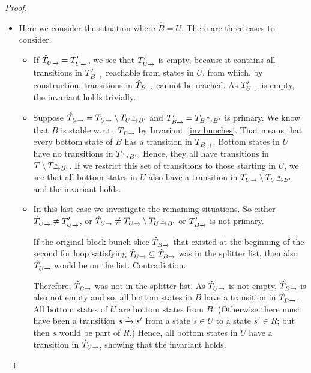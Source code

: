 \documentclass[a4paper,10pt]{article}
\theoremstyle{definition}
\theoremstyle{plain}
\newcommand{\pijl}[1]{\mathrel{\text{$\xrightarrow{\smash[t]{#1}}$}}}
\newcommand{\TB}{T_{B\pijl{}}}
\newcommand{\TBaB}{T_{B\pijl{a} B'}}
\newcommand{\TaB}{T_{\pijl{a} B'}}
\begin{document}
\begin{proof}
\begin{itemize}
\begin{itemize}
		Therefore, $\hat{T}_{B\pijl{}}$ was not in the splitter list.
		As $\hat{T}_{B\pijl{}}$ was not empty, all bottom states in $B$ would have transitions in $\hat{T}_{B\pijl{}}$.
		As all new bottom states are moved to $N$, all bottom states in $R'$ are also bottom states in $B$,
		and it follows that all bottom states in $R'$ have transitions in $\hat{T}_{R'\pijl{}}$.
		Hence, the invariant holds.
	\end{itemize}
\item
	Here we consider the situation where $\hat{B}=U$.
	There are three cases to consider.%
	\begin{itemize}
	\item	If $\hat{T}_{U\pijl{}}=T'_{U\pijl{}}$,
		we see that $T'_{U\pijl{}}$ is empty,
		because it contains all transitions in $T'_{B\pijl{}}$ reachable from states in $U$,
		from which, by construction, transitions in $\hat{T}_{B\pijl{}}$ cannot be reached.
		As $T'_{U\pijl{}}$ is empty, the invariant holds trivially.
	\item	Suppose $\hat{T}_{U\pijl{}}=T_{U\pijl{}}\setminus T_{U\pijl{a}B'}$ and $\TB' = \TBaB$ is primary.
		We know that $B$ is stable w.r.t.\ $\TB$ by Invariant~\ref{inv:bunches}.
		That means that every bottom state of $B$ has a transition in $\TB$.
		Bottom states in $U$ have no transitions in $\TaB$.
		Hence, they all have transitions in $T\setminus \TaB$.
		If we restrict this set of transitions to those starting in $U$,
		we see that all bottom states in $U$ also have a transition in $T_{U\pijl{}}\setminus T_{U\pijl{a}B'}$
		and the invariant holds.
	\item	In this last case we investigate the remaining situations.
		So either $\hat{T}_{U\pijl{}} \not= T'_{U\pijl{}}$,
		or $\hat{T}_{U\pijl{}} \not= T_{U\pijl{}}\setminus T_{U\pijl{a}B'}$
		or $\TB'$ is not primary.

		If the original block-bunch-slice $\hat{T}_{B\pijl{}}$
		that existed at the beginning of the second for loop satisfying $\hat{T}_{U\pijl{}} \subseteq \hat{T}_{B\pijl{}}$
		was in the splitter list,
		then also $\hat{T}_{U\pijl{}}$ would be on the list.
		Contradiction.

		Therefore, $\hat{T}_{B\pijl{}}$ was not in the splitter list.
		As $\hat{T}_{U\pijl{}}$ is not empty,
		$\hat{T}_{B\pijl{}}$ is also not empty
		and so, all bottom states in $B$ have a transition in $\hat{T}_{B\pijl{}}$.
		All bottom states of $U$ are bottom states from $B$.
		(Otherwise there must have been a transition $s\pijl{\tau}s'$ from a state $s\in U$ to a state $s'\in R$;
		but then $s$ would be part of $R$.)
		Hence, all bottom states in $U$ have a transition in $\hat{T}_{U\pijl{}}$, showing that the invariant holds.
		\qedhere
	\end{itemize}
\end{itemize}
\end{proof}
\end{document}
